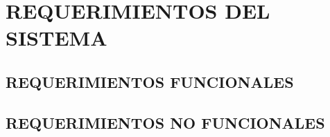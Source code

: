 \section{REQUERIMIENTOS DEL SISTEMA}
\subsection{REQUERIMIENTOS FUNCIONALES}
\subsection{REQUERIMIENTOS NO FUNCIONALES}